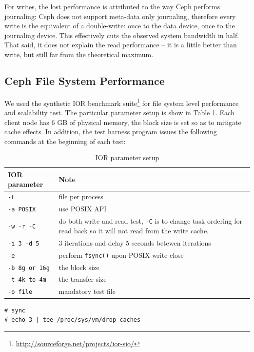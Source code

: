 For writes, the lost performance is attributed to the way Ceph performs
journaling:
Ceph does not support meta-data only journaling, therefore every write is the
equivalent of a double-write: once to the data device, once to the journaling
device. This effectively cuts the observed system bandwidth in half. That said,
it does not explain the read performance -- it is a little better than write,
but still far from the theoretical maximum.

\subsection{Ceph File System Performance}
\label{sec:ior-initial}

We used the synthetic IOR benchmark
suite\footnote{\url{http://sourceforge.net/projects/ior-sio/}} for file system
level performance and scalability test.  The particular parameter setup is show
in Table \ref{tbl:ior}. Each client node has 6 GB of physical memory, the block
size is set so as to mitigate cache effects. In addition, the test harness
program issues the following commands at the beginning of each test:


\begin{table}[tb]
\caption{IOR parameter setup}
\label{tbl:ior}
\centering
\begin{tabular}{p{0.8in} | p{2in}}
    \hline
    IOR parameter & Note \\ \hline
    \verb!-F! & file per process \\ \hline
    \verb!-a POSIX! & use POSIX API \\ \hline
    \verb!-w -r -C! & do both write and read test, \verb!-C! is to change task
        ordering for read back so it will not read from the write cache. \\
        \hline
    \verb!-i 3 -d 5! & 3 iterations and delay 5 seconds betewen iterations \\ \hline  
    \verb!-e! & perform \verb!fsync()! upon POSIX write close \\ \hline
    \verb!-b 8g or 16g! & the block size \\ \hline
    \verb!-t 4k to 4m! & the transfer size \\ \hline
    \verb!-o file! & mandatory test file  \\    
    \hline
\end{tabular}
\end{table}


\begin{Verbatim}[fontsize=\small]
# sync
# echo 3 | tee /proc/sys/vm/drop_caches
\end{Verbatim}


